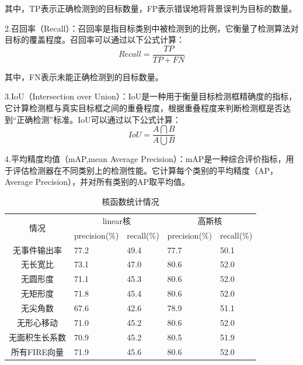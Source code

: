 其中，TP表示正确检测到的目标数量，FP表示错误地将背景误判为目标的数量。

2.召回率（Recall）：召回率是指目标类别中被检测到的比例，它衡量了检测算法对目标的覆盖程度。召回率可以通过以下公式计算：
\begin{equation} 
    Recall=\frac{TP}{TP+FN}
\end{equation}


其中，FN表示未能正确检测到的目标数量。

3.IoU（Intersection over Union）：IoU是一种用于衡量目标检测框精确度的指标，它计算检测框与真实目标框之间的重叠程度，根据重叠程度来判断检测框是否达到“正确检测”标准。IoU可以通过以下公式计算：
\begin{equation} 
    IoU=\frac{A\bigcap B}{A\bigcup B}
\end{equation}

4.平均精度均值（mAP,mean Average Precision）：mAP是一种综合评价指标，用于评估检测器在不同类别上的检测性能。它计算每个类别的平均精度（AP，Average Precision），并对所有类别的AP取平均值。

\begin{table}[ht]
    \centering
    \caption{核函数统计情况}
    \begin{tabularx}{\textwidth}{c|X|X|X|X}
    \toprule
    \multicolumn{1}{c|}{\multirow{2}{*}{情况}} & \multicolumn{2}{c|}{linear核} & \multicolumn{2}{c}{高斯核} \\ \cmidrule(l){2-5} 
    \multicolumn{1}{c|}{}  & precision(\%)     & recall(\%)    & precision(\%)   & recall(\%)  \\
    \midrule
    无事件输出率             & 77.2        & 49.4          & 77.7      & 50.1        \\
    无长宽比                & 73.1        & 47.0          & 80.6      & 52.0        \\
    无圆形度                & 71.1        & 45.3          & 80.6      & 52.0        \\
    无矩形度                & 71.8        & 45.4          & 80.6      & 52.0        \\
    无尖角数                & 67.6        & 42.6          & 78.9      & 51.1        \\
    无形心移动              & 71.0        & 45.2          & 80.6      & 52.0        \\
    无面积生长系数           & 70.9        & 45.2          & 80.5      & 51.9        \\
    所有FIRE向量            & 71.9        & 45.6          & 80.6      & 52.0       \\
    \bottomrule
    \end{tabularx}
    \label{kernel}
\end{table}

